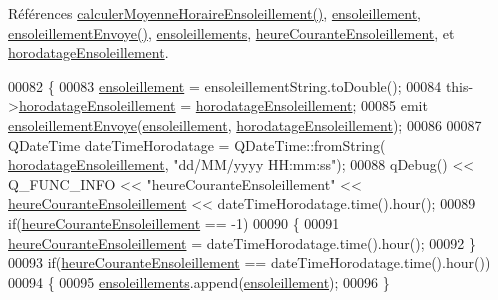 Références \hyperlink{class_infos_ensoleillement_a43d0967a59887bf70071296fef0660d3}{calculer\+Moyenne\+Horaire\+Ensoleillement()}, \hyperlink{class_infos_ensoleillement_a5f3ad64743e3beeb4e64c4555ec6155c}{ensoleillement}, \hyperlink{class_infos_ensoleillement_ac89935ebb118ba2d28504d7341f67a7f}{ensoleillement\+Envoye()}, \hyperlink{class_infos_ensoleillement_a6c3640ed7f3169e6263dc04b0191f478}{ensoleillements}, \hyperlink{class_infos_ensoleillement_adbf40d147f8a7dbcf5f71b1ac4e0933d}{heure\+Courante\+Ensoleillement}, et \hyperlink{class_infos_ensoleillement_aa2014f9d13e69e9807543737240dbfd3}{horodatage\+Ensoleillement}.


\begin{DoxyCode}
00082 \{
00083     \hyperlink{class_infos_ensoleillement_a5f3ad64743e3beeb4e64c4555ec6155c}{ensoleillement} = ensoleillementString.toDouble();
00084     this->\hyperlink{class_infos_ensoleillement_aa2014f9d13e69e9807543737240dbfd3}{horodatageEnsoleillement} = 
      \hyperlink{class_infos_ensoleillement_aa2014f9d13e69e9807543737240dbfd3}{horodatageEnsoleillement};
00085     emit \hyperlink{class_infos_ensoleillement_ac89935ebb118ba2d28504d7341f67a7f}{ensoleillementEnvoye}(\hyperlink{class_infos_ensoleillement_a5f3ad64743e3beeb4e64c4555ec6155c}{ensoleillement},
      \hyperlink{class_infos_ensoleillement_aa2014f9d13e69e9807543737240dbfd3}{horodatageEnsoleillement});
00086 
00087     QDateTime dateTimeHorodatage = QDateTime::fromString(
      \hyperlink{class_infos_ensoleillement_aa2014f9d13e69e9807543737240dbfd3}{horodatageEnsoleillement}, \textcolor{stringliteral}{"dd/MM/yyyy HH:mm:ss"});
00088     qDebug() << Q\_FUNC\_INFO << \textcolor{stringliteral}{"heureCouranteEnsoleillement"} << 
      \hyperlink{class_infos_ensoleillement_adbf40d147f8a7dbcf5f71b1ac4e0933d}{heureCouranteEnsoleillement} << dateTimeHorodatage.time().hour();
00089     \textcolor{keywordflow}{if}(\hyperlink{class_infos_ensoleillement_adbf40d147f8a7dbcf5f71b1ac4e0933d}{heureCouranteEnsoleillement} == -1)
00090     \{
00091         \hyperlink{class_infos_ensoleillement_adbf40d147f8a7dbcf5f71b1ac4e0933d}{heureCouranteEnsoleillement} = dateTimeHorodatage.time().hour();
00092     \}
00093     \textcolor{keywordflow}{if}(\hyperlink{class_infos_ensoleillement_adbf40d147f8a7dbcf5f71b1ac4e0933d}{heureCouranteEnsoleillement} == dateTimeHorodatage.time().hour())
00094     \{
00095         \hyperlink{class_infos_ensoleillement_a6c3640ed7f3169e6263dc04b0191f478}{ensoleillements}.append(\hyperlink{class_infos_ensoleillement_a5f3ad64743e3beeb4e64c4555ec6155c}{ensoleillement});
00096     \}

\end{DoxyCode}
